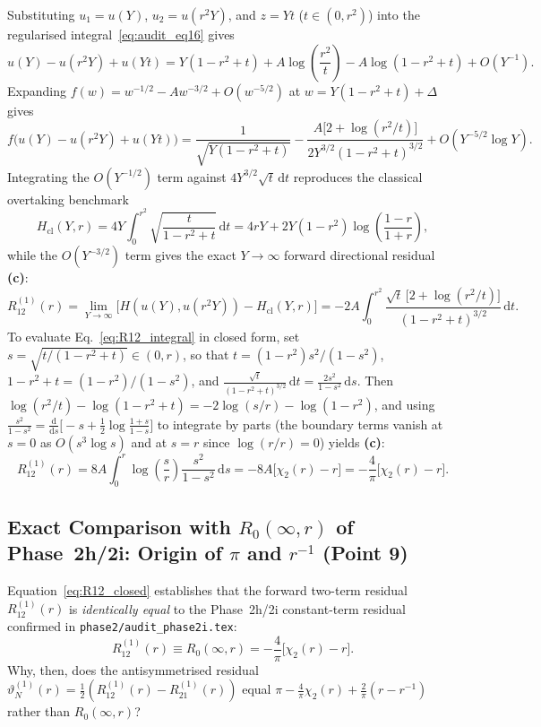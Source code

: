 \documentclass[11pt,a4paper]{article}
\newcommand{\dd}{\mathrm{d}}
\begin{document}
Substituting $u_1=u(Y)$, $u_2=u(r^2Y)$, and $z=Y t$ ($t\in(0,r^2)$) into the regularised integral~\eqref{eq:audit_eq16} gives
\[
  u(Y)-u(r^2Y)+u(Yt) = Y(1-r^2+t) + A\log\!\left(\frac{r^2}{t}\right) - A\log(1-r^2+t) + O(Y^{-1}).
\]
Expanding $f(w)=w^{-1/2}-Aw^{-3/2}+O(w^{-5/2})$ at $w=Y(1-r^2+t)+\Delta$ gives
\[
  f\bigl(u(Y)-u(r^2Y)+u(Yt)\bigr) = \frac{1}{\sqrt{Y(1-r^2+t)}} - \frac{A\bigl[2+\log(r^2/t)\bigr]}{2Y^{3/2}(1-r^2+t)^{3/2}} + O(Y^{-5/2}\log Y).
\]
Integrating the $O(Y^{-1/2})$ term against $4Y^{3/2}\sqrt{t}\,\dd t$ reproduces the classical overtaking benchmark
\[
  H_{\mathrm{cl}}(Y,r) = 4Y\int_0^{r^2}\sqrt{\frac{t}{1-r^2+t}}\,\dd t = 4rY + 2Y(1-r^2)\log\!\left(\frac{1-r}{1+r}\right),
\]
 while the $O(Y^{-3/2})$ term gives the exact $Y\to\infty$ forward directional residual \textbf{(c)}:
\begin{equation}\label{eq:R12_integral}
  R_{12}^{(1)}(r) = \lim_{Y\to\infty}\bigl[H(u(Y),u(r^2Y))-H_{\mathrm{cl}}(Y,r)\bigr] = -2A\int_0^{r^2}\frac{\sqrt{t}\,\bigl[2+\log(r^2/t)\bigr]}{(1-r^2+t)^{3/2}}\,\dd t.
\end{equation}
To evaluate Eq.~\eqref{eq:R12_integral} in closed form, set $s=\sqrt{t/(1-r^2+t)}\in(0,r)$, so that $t=(1-r^2)s^2/(1-s^2)$, $1-r^2+t=(1-r^2)/(1-s^2)$, and $\frac{\sqrt{t}}{(1-r^2+t)^{3/2}}\,\dd t = \frac{2s^2}{1-s^2}\,\dd s$. Then $\log(r^2/t)-\log(1-r^2+t)=-2\log(s/r)-\log(1-r^2)$, and using $\frac{s^2}{1-s^2}=\frac{\dd}{\dd s}\bigl[-s+\frac12\log\frac{1+s}{1-s}\bigr]$ to integrate by parts (the boundary terms vanish at $s=0$ as $O(s^3\log s)$ and at $s=r$ since $\log(r/r)=0$) yields \textbf{(c)}:
\begin{equation}\label{eq:R12_closed}
  R_{12}^{(1)}(r) = 8A\int_0^r \log\!\left(\frac{s}{r}\right)\frac{s^2}{1-s^2}\,\dd s = -8A\bigl[\chi_2(r)-r\bigr] = -\frac{4}{\pi}\bigl[\chi_2(r)-r\bigr].
\end{equation}

\subsection{Exact Comparison with \texorpdfstring{$R_0(\infty,r)$}{R0(infinity,r)} of Phase~2h/2i: Origin of \texorpdfstring{$\pi$}{pi} and \texorpdfstring{$r^{-1}$}{r\^{}(-1)} (Point 9)}

Equation~\eqref{eq:R12_closed} establishes that the forward two-term residual $R_{12}^{(1)}(r)$ is \emph{identically equal} to the Phase~2h/2i constant-term residual confirmed in \texttt{phase2/audit\_phase2i.tex}:
\begin{equation}
  R_{12}^{(1)}(r) \equiv R_0(\infty,r) = -\frac{4}{\pi}\bigl[\chi_2(r)-r\bigr].
\end{equation}
Why, then, does the antisymmetrised residual $\vartheta_N^{(1)}(r)=\frac12(R_{12}^{(1)}(r)-R_{21}^{(1)}(r))$ equal $\pi - \frac{4}{\pi}\chi_2(r) + \frac{2}{\pi}(r-r^{-1})$ rather than $R_0(\infty,r)$?
\end{document}
